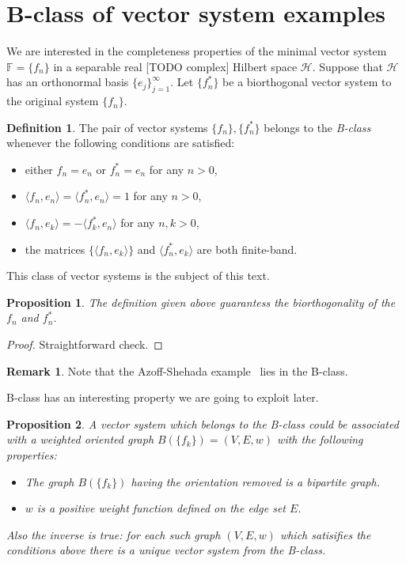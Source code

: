 \documentclass[12pt]{article}
\newcommand\inner[2]{\langle #1, #2 \rangle}
\renewcommand{\cal}[1]{\mathcal{#1}}
\newtheorem{prop}{Proposition}
\theoremstyle{definition}
\newtheorem{remark}{Remark}
\newtheorem{definition}{Definition}
\newcommand{\fsys}{\mathbb{F}}
\numberwithin{remark}{section}
\numberwithin{theorem}{section}
\numberwithin{prop}{section}
\numberwithin{equation}{section}
\numberwithin{lemma}{section}
\numberwithin{prop_under_lemma}{lemma}
\begin{document}


\section{B-class of vector system examples}
    We are interested in the completeness properties of the minimal vector system $\fsys = \{f_n\}$ in a separable real [TODO complex] Hilbert space $\cal{H}$.
    Suppose that $\cal{H}$ has an orthonormal basis $\{e_j\}_{j=1}^\infty$.
    Let $\{f^*_n\}$ be a biorthogonal vector system to the original system $\{f_n\}$.
    \begin{definition}
        The pair of vector systems $\{f_n\}, \{f^*_n\}$ belongs to the \textit{B-class} whenever the following conditions are satisfied:
        \begin{itemize}
            \item either $f_n = e_n$ or $f^*_n = e_n$ for any $n > 0$,
            \item $\langle f_n, e_n\rangle = \langle f^*_n, e_n \rangle = 1$ for any $n > 0$,
            \item $\langle f_n, e_k \rangle = -\langle f^*_k, e_n \rangle$ for any $n, k > 0$,
            \item the matrices $\{\langle f_n, e_k\rangle\}$ and $\inner{f^*_n}{e_k}$ are both finite-band.
        \end{itemize}
    \end{definition}
    This class of vector systems is the subject of this text.
    \begin{prop}
        The definition given above guarantess the biorthogonality of the $f_n$ and $f^*_n$.
    \end{prop}
    \begin{proof}
        Straightforward check.
    \end{proof}
    \begin{remark}
        Note that the Azoff-Shehada example~\cite{azoff} lies in the B-class.
    \end{remark}
    B-class has an interesting property we are going to exploit later.
    \begin{prop}
        A vector system which belongs to the B-class could be associated with a 
        weighted oriented graph $B(\{f_k\}) = (V, E, w)$ with the following properties:
        \begin{itemize}
            \item The graph $B(\{f_k\})$ having the orientation removed is a bipartite graph.
            \item $w$ is a positive weight function defined on the edge set $E$.
        \end{itemize}
        Also the inverse is true: for each such graph $(V, E, w)$ which satisifies the conditions above there is a unique
        vector system from the B-class.
    \end{prop}
\end{document}
